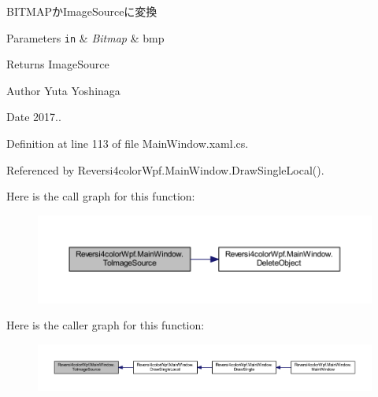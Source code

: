 B\+I\+T\+M\+A\+Pか\+Image\+Sourceに変換 


\begin{DoxyParams}[1]{Parameters}
\mbox{\tt in}  & {\em Bitmap} & bmp \\
\hline
\end{DoxyParams}
\begin{DoxyReturn}{Returns}
Image\+Source 
\end{DoxyReturn}
\begin{DoxyAuthor}{Author}
Yuta Yoshinaga 
\end{DoxyAuthor}
\begin{DoxyDate}{Date}
2017.. 
\end{DoxyDate}


Definition at line 113 of file Main\+Window.\+xaml.\+cs.



Referenced by Reversi4color\+Wpf.\+Main\+Window.\+Draw\+Single\+Local().



Here is the call graph for this function\+:
\nopagebreak
\begin{figure}[H]
\begin{center}
\leavevmode
\includegraphics[width=350pt]{class_reversi4color_wpf_1_1_main_window_a843b47fa1b0cf377435e262e32459705_cgraph}
\end{center}
\end{figure}




Here is the caller graph for this function\+:
\nopagebreak
\begin{figure}[H]
\begin{center}
\leavevmode
\includegraphics[width=350pt]{class_reversi4color_wpf_1_1_main_window_a843b47fa1b0cf377435e262e32459705_icgraph}
\end{center}
\end{figure}


